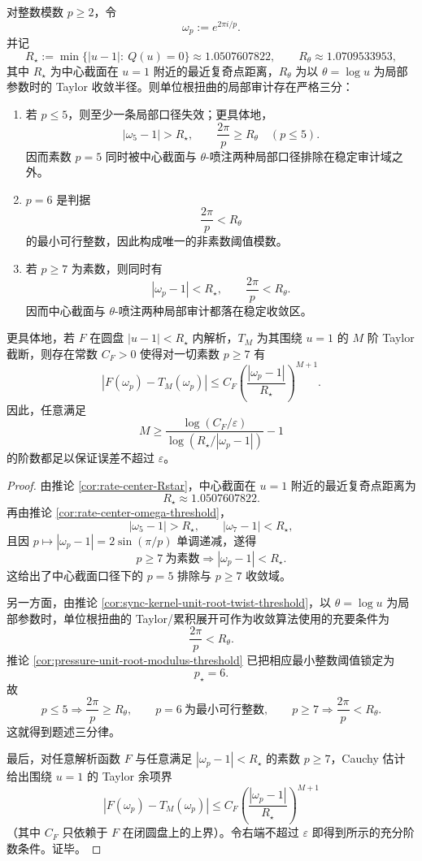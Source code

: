 \begin{theorem}[单位根扭曲局部审计的模数三分律]\label{thm:conclusion-realinput40-unitroot-local-audit-modulus-trichotomy}
对整数模数 \(p\ge 2\)，令
\[
\omega_p:=e^{2\pi i/p}.
\]
并记
\[
R_\star:=\min\{|u-1|:\ Q(u)=0\}\approx 1.0507607822,
\qquad
R_\theta\approx 1.0709533953,
\]
其中 \(R_\star\) 为中心截面在 \(u=1\) 附近的最近复奇点距离，\(R_\theta\) 为以 \(\theta=\log u\) 为局部参数时的 Taylor 收敛半径。则单位根扭曲的局部审计存在严格三分：
\begin{enumerate}
  \item 若 \(p\le 5\)，则至少一条局部口径失效；更具体地，
  \[
  |\omega_5-1|>R_\star,
  \qquad
  \frac{2\pi}{p}\ge R_\theta \quad (p\le 5).
  \]
  因而素数 \(p=5\) 同时被中心截面与 \(\theta\)-喷注两种局部口径排除在稳定审计域之外。
  \item \(p=6\) 是判据
  \[
  \frac{2\pi}{p}<R_\theta
  \]
  的最小可行整数，因此构成唯一的非素数阈值模数。
  \item 若 \(p\ge 7\) 为素数，则同时有
  \[
  |\omega_p-1|<R_\star,
  \qquad
  \frac{2\pi}{p}<R_\theta.
  \]
  因而中心截面与 \(\theta\)-喷注两种局部审计都落在稳定收敛区。
\end{enumerate}
更具体地，若 \(F\) 在圆盘 \(|u-1|<R_\star\) 内解析，\(T_M\) 为其围绕 \(u=1\) 的 \(M\) 阶 Taylor 截断，则存在常数 \(C_F>0\) 使得对一切素数 \(p\ge 7\) 有
\[
|F(\omega_p)-T_M(\omega_p)|
\le
C_F\left(\frac{|\omega_p-1|}{R_\star}\right)^{M+1}.
\]
因此，任意满足
\[
M\ge
\frac{\log(C_F/\varepsilon)}{\log(R_\star/|\omega_p-1|)}-1
\]
的阶数都足以保证误差不超过 \(\varepsilon\)。
\end{theorem}
\begin{proof}
由推论 \ref{cor:rate-center-Rstar}，中心截面在 \(u=1\) 附近的最近复奇点距离为
\[
R_\star\approx 1.0507607822.
\]
再由推论 \ref{cor:rate-center-omega-threshold}，
\[
|\omega_5-1|>R_\star,
\qquad
|\omega_7-1|<R_\star,
\]
且因 \(p\mapsto |\omega_p-1|=2\sin(\pi/p)\) 单调递减，遂得
\[
p\ge 7\ \text{为素数}
\Longrightarrow
|\omega_p-1|<R_\star.
\]
这给出了中心截面口径下的 \(p=5\) 排除与 \(p\ge 7\) 收敛域。

另一方面，由推论 \ref{cor:sync-kernel-unit-root-twist-threshold}，以 \(\theta=\log u\) 为局部参数时，单位根扭曲的 Taylor/累积展开可作为收敛算法使用的充要条件为
\[
\frac{2\pi}{p}<R_\theta.
\]
推论 \ref{cor:pressure-unit-root-modulus-threshold} 已把相应最小整数阈值锁定为
\[
p_\star=6.
\]
故
\[
p\le 5\Longrightarrow \frac{2\pi}{p}\ge R_\theta,
\qquad
p=6\ \text{为最小可行整数},
\qquad
p\ge 7\Longrightarrow \frac{2\pi}{p}<R_\theta.
\]
这就得到题述三分律。

最后，对任意解析函数 \(F\) 与任意满足 \(|\omega_p-1|<R_\star\) 的素数 \(p\ge 7\)，Cauchy 估计给出围绕 \(u=1\) 的 Taylor 余项界
\[
|F(\omega_p)-T_M(\omega_p)|
\le
C_F\left(\frac{|\omega_p-1|}{R_\star}\right)^{M+1}
\]
（其中 \(C_F\) 只依赖于 \(F\) 在闭圆盘上的上界）。令右端不超过 \(\varepsilon\) 即得到所示的充分阶数条件。证毕。
\end{proof}

